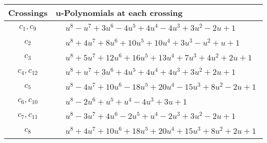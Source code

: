 \documentclass[1p]{elsarticle_modified}
\theoremstyle{definition}
\begin{document}
\begin{tabular}{m{50pt}|m{274pt}}
Crossings & \hspace{64pt}u-Polynomials at each crossing \\
\hline $$\begin{aligned}c_{1},c_{9}\end{aligned}$$&$\begin{aligned}
&u^8- u^7+3 u^6-4 u^5+4 u^4-4 u^3+3 u^2-2 u+1
\end{aligned}$\\
\hline $$\begin{aligned}c_{2}\end{aligned}$$&$\begin{aligned}
&u^8+4 u^7+8 u^6+10 u^5+10 u^4+3 u^3- u^2+u+1
\end{aligned}$\\
\hline $$\begin{aligned}c_{3}\end{aligned}$$&$\begin{aligned}
&u^8+5 u^7+12 u^6+16 u^5+13 u^4+7 u^3+4 u^2+2 u+1
\end{aligned}$\\
\hline $$\begin{aligned}c_{4},c_{12}\end{aligned}$$&$\begin{aligned}
&u^8+u^7+3 u^6+4 u^5+4 u^4+4 u^3+3 u^2+2 u+1
\end{aligned}$\\
\hline $$\begin{aligned}c_{5}\end{aligned}$$&$\begin{aligned}
&u^8-4 u^7+10 u^6-18 u^5+20 u^4-15 u^3+8 u^2-2 u+1
\end{aligned}$\\
\hline $$\begin{aligned}c_{6},c_{10}\end{aligned}$$&$\begin{aligned}
&u^8-2 u^6+u^5+u^4-4 u^3+3 u+1
\end{aligned}$\\
\hline $$\begin{aligned}c_{7},c_{11}\end{aligned}$$&$\begin{aligned}
&u^8-3 u^7+4 u^6-2 u^5+u^4-2 u^3+3 u^2-2 u+1
\end{aligned}$\\
\hline $$\begin{aligned}c_{8}\end{aligned}$$&$\begin{aligned}
&u^8+4 u^7+10 u^6+18 u^5+20 u^4+15 u^3+8 u^2+2 u+1
\end{aligned}$\\
\hline
\end{tabular}\\~\\
\end{document}
